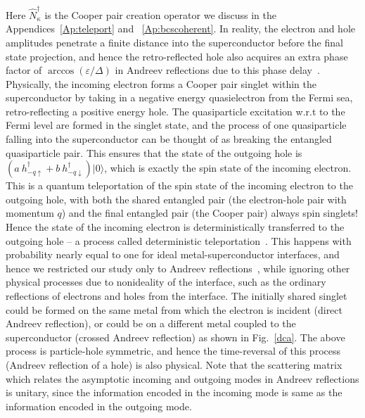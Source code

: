 \documentclass[12pt,letterpaper,aps,onecolumn,superscriptaddress,floatfix,notitlepage]{revtex4-1}
\begin{document}
	Here $\hat{N}_{\kappa}^{\dagger}$ is the Cooper pair creation operator we discuss in the Appendices~\ref{Ap:teleport} and ~\ref{Ap:bcscoherent}. In reality,	the electron and hole amplitudes penetrate  a finite distance into the superconductor before the final state projection, and hence the retro-reflected hole also acquires an extra phase factor of $\arccos({\varepsilon/\Delta})$ in Andreev reflections due to this phase delay~\cite{spintron}.	Physically, the incoming electron forms a Cooper pair singlet within the superconductor by taking in a negative energy quasielectron from the Fermi sea, retro-reflecting a positive energy hole. The quasiparticle excitation w.r.t to the Fermi level are formed in the singlet state, and the process of one quasiparticle falling into the superconductor can be thought of as breaking the entangled quasiparticle pair. This ensures that the state of the outgoing hole is  $(a~h^{\dagger}_{-q\uparrow}+b~h^{\dagger}_{-q\downarrow})|0\rangle$, which is exactly the spin state of the incoming electron. This is a quantum teleportation of the spin state of the incoming electron to the outgoing hole, with both the shared entangled pair (the electron-hole pair with momentum $q$) and the final entangled pair (the Cooper pair) always spin singlets! Hence the state of the incoming electron is deterministically transferred to the outgoing hole -- a process called deterministic teleportation~\cite{CTC,projection}. This happens with probability nearly equal to one for ideal metal-superconductor interfaces, and hence we restricted our study only to Andreev reflections~\cite{andreev,Pannet,spintron,artemenko1978excess,artemenko1979theory,artemenko1979excess,zaitsev1980theory}, while ignoring other physical processes due to nonideality of the interface, such as the ordinary reflections of electrons and holes from the interface. The initially shared singlet could be formed on the same metal from which the electron is incident (direct Andreev reflection), or could be on a different metal coupled to the superconductor (crossed Andreev reflection) as shown in Fig.~\ref{dca}.  The above process is particle-hole symmetric, and hence the time-reversal of this process (Andreev reflection of a hole) is also physical. Note that the scattering matrix which relates the asymptotic incoming and outgoing modes in Andreev reflections is unitary, since the information encoded in the incoming mode is same as the information encoded in the outgoing mode.
\end{document}
